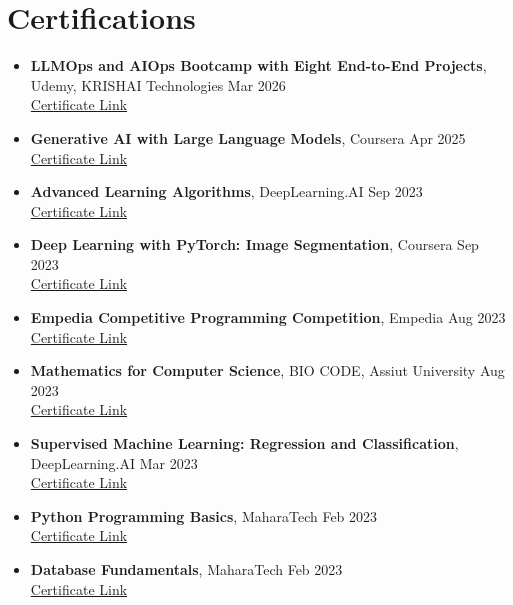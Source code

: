 \documentclass[10pt,letterpaper]{article}
\begin{document}
\section{Certifications}
\begin{itemize}
\item \textbf{LLMOps and AIOps Bootcamp with Eight End-to-End Projects}, Udemy, KRISHAI Technologies \hfill Mar 2026\\
\href{https://drive.google.com/file/d/1LRMq4abpNwBmxEh_bcviQSFq132oCCFC/view?usp=drive_link}{Certificate Link}
\item \textbf{Generative AI with Large Language Models}, Coursera \hfill Apr 2025\\
\href{https://drive.google.com/file/d/1qkDcCiYGasivGr5Ozfq51DuBgaE9j0fO/view?usp=drivesdk}{Certificate Link}
\item \textbf{Advanced Learning Algorithms}, DeepLearning.AI \hfill Sep 2023\\
\href{https://drive.google.com/file/d/1Z9-hwfvvIeLOC-8foyEUdOdJaSkE454v/view}{Certificate Link}
\item \textbf{Deep Learning with PyTorch: Image Segmentation}, Coursera \hfill Sep 2023\\
\href{https://drive.google.com/file/d/1byehbMkf4Dr-BL1l5z1EIZo6ju8OVS-5/view}{Certificate Link}
\item \textbf{Empedia Competitive Programming Competition}, Empedia \hfill Aug 2023\\
\href{https://drive.google.com/file/d/1N9leyAlDCAoQzjANXn2pMyp6Ec1NC_Td/view}{Certificate Link}
\item \textbf{Mathematics for Computer Science}, BIO CODE, Assiut University \hfill Aug 2023\\
\href{https://drive.google.com/file/d/1XvkvbVA_PuUV7hGh3bC6Cu3Z-ZVlwk1D/view}{Certificate Link}
\item \textbf{Supervised Machine Learning: Regression and Classification}, DeepLearning.AI \hfill Mar 2023\\
\href{https://drive.google.com/file/d/1FOQtu1kBrybHJn99R28ZX3afhqk_I6Wj/view}{Certificate Link}
\item \textbf{Python Programming Basics}, MaharaTech \hfill Feb 2023\\
\href{https://drive.google.com/file/d/13DwIJIlSSwFtjmZxjMQ2dic9SpJJu5SY/view}{Certificate Link}
\item \textbf{Database Fundamentals}, MaharaTech \hfill Feb 2023\\
\href{https://drive.google.com/file/d/1YMmTIxpXn5Nbpqqwb5jBVqCpGkQrXioX/view}{Certificate Link}
\end{itemize}
\end{document}
